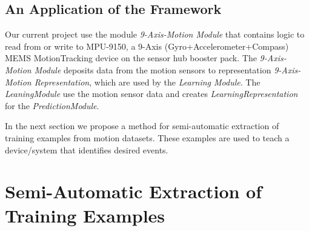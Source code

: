 \documentclass{IEEEtran}
\begin{document}


\subsection{An Application of the Framework}

Our current project use 
the module {\em 
9-Axis-Motion Module} that contains logic to read from or write to MPU-9150, a 9-Axis 
(Gyro+Accelerometer+Compass) MEMS MotionTracking device on the sensor hub booster pack. The {\em 
9-Axis-Motion Module} deposits data from the motion sensors to 
representation {\em 9-Axis-Motion Representation}, which are used by the {\em 
Learning Module}. The {\em LeaningModule} use the motion sensor data and creates {\em LearningRepresentation} for the {\em PredictionModule}. 

\par 

In the next section we propose a method for semi-automatic extraction of training examples from motion datasets. These examples are used to teach a device/system that identifies desired events. 

\section{Semi-Automatic Extraction of  Training Examples}
\label{sec:SemiAutomaticExtractionOfTrainingVectors}
\end{document}
